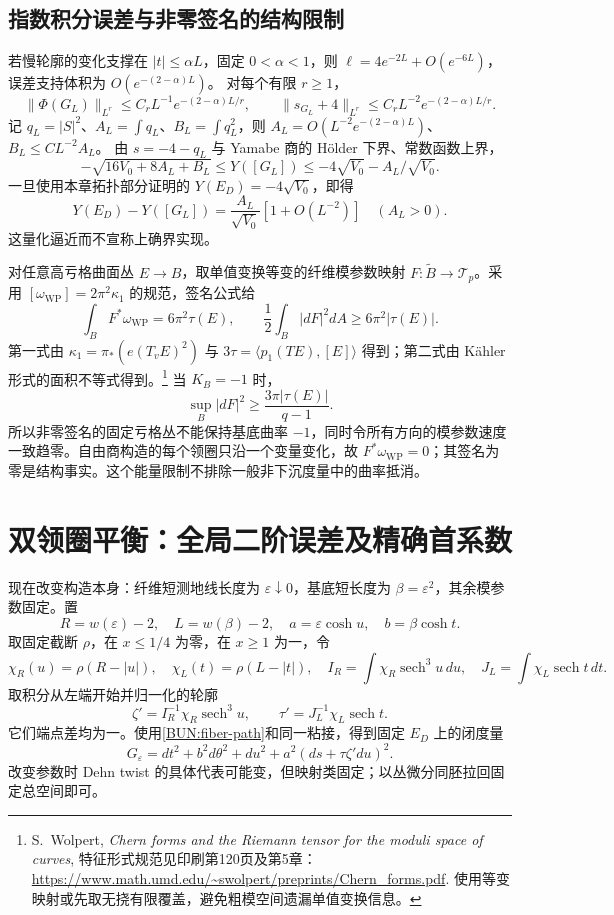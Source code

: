 \documentclass[UTF8,fontset=fandol,zihao=-4,oneside,openany]{ctexbook}
\theoremstyle{cjkplain}
\numberwithin{equation}{chapter}
\begin{document}
\subsection{指数积分误差与非零签名的结构限制}
若慢轮廓的变化支撑在 $|t|\le\alpha L$，固定 $0<\alpha<1$，则
$\ell=4e^{-2L}+O(e^{-6L})$，误差支持体积为 $O(e^{-(2-\alpha)L})$。
对每个有限 $r\ge1$，
\[
 \|\Phi(G_L)\|_{L^r}\le C_rL^{-1}e^{-(2-\alpha)L/r},
 \qquad\|s_{G_L}+4\|_{L^r}\le C_rL^{-2}e^{-(2-\alpha)L/r}.
\]
记 $q_L=|S|^2$、$A_L=\int q_L$、$B_L=\int q_L^2$，则
$A_L=O(L^{-2}e^{-(2-\alpha)L})$、$B_L\le CL^{-2}A_L$。
由 $s=-4-q_L$ 与 Yamabe 商的 Hölder 下界、常数函数上界，
\[
 -\sqrt{16V_0+8A_L+B_L}\le Y([G_L])
 \le-4\sqrt{V_0}-A_L/\sqrt{V_0}.
\]
一旦使用本章拓扑部分证明的 $Y(E_D)=-4\sqrt{V_0}$，即得
\[
 Y(E_D)-Y([G_L])=\frac{A_L}{\sqrt{V_0}}[1+O(L^{-2})]
 \quad(A_L>0).
\]
这量化逼近而不宣称上确界实现。

对任意高亏格曲面丛 $E\to B$，取单值变换等变的纤维模参数映射
$F:\widetilde B\to\mathcal T_p$。采用
$[\omega_{\mathrm{WP}}]=2\pi^2\kappa_1$ 的规范，签名公式给
\begin{equation}
 \int_B F^*\omega_{\mathrm{WP}}=6\pi^2\tau(E),
 \qquad\frac12\int_B|dF|^2dA\ge6\pi^2|\tau(E)|.
 \label{BUN:WP-signature}
\end{equation}
第一式由 $\kappa_1=\pi_*(e(T_vE)^2)$ 与 $3\tau=\langle p_1(TE),[E]\rangle$ 得到；第二式由 Kähler 形式的面积不等式得到。\footnote{S.~Wolpert, \emph{Chern forms and the Riemann tensor for the moduli space of curves}, 特征形式规范见印刷第120页及第5章：\url{https://www.math.umd.edu/~swolpert/preprints/Chern_forms.pdf}. 使用等变映射或先取无挠有限覆盖，避免粗模空间遗漏单值变换信息。}
当 $K_B=-1$ 时，
\[
 \sup_B|dF|^2\ge\frac{3\pi|\tau(E)|}{q-1}.
\]
所以非零签名的固定亏格丛不能保持基底曲率 $-1$，同时令所有方向的模参数速度一致趋零。自由商构造的每个领圈只沿一个变量变化，故 $F^*\omega_{\mathrm{WP}}=0$；其签名为零是结构事实。这个能量限制不排除一般非下沉度量中的曲率抵消。

\section{双领圈平衡：全局二阶误差及精确首系数}
\label{BUN:double}

现在改变构造本身：纤维短测地线长度为 $\varepsilon\downarrow0$，基底短长度为 $\beta=\varepsilon^2$，其余模参数固定。置
\[
 R=w(\varepsilon)-2,\quad L=w(\beta)-2,
 \quad a=\varepsilon\cosh u,\quad b=\beta\cosh t.
\]
取固定截断 $\rho$，在 $x\le1/4$ 为零，在 $x\ge1$ 为一，令
\[
 \chi_R(u)=\rho(R-|u|),\quad \chi_L(t)=\rho(L-|t|),
 \quad I_R=\int\chi_R\operatorname{sech}^3u\,du,
 \quad J_L=\int\chi_L\operatorname{sech}t\,dt.
\]
取积分从左端开始并归一化的轮廓
\begin{equation}
 \zeta'=I_R^{-1}\chi_R\operatorname{sech}^3u,
 \qquad \tau'=J_L^{-1}\chi_L\operatorname{sech}t.
 \label{BUN:balanced-profiles}
\end{equation}
它们端点差均为一。使用\eqref{BUN:fiber-path}和同一粘接，得到固定 $E_D$ 上的闭度量
\begin{equation}
 G_\varepsilon=dt^2+b^2d\theta^2+du^2+
 a^2(ds+\tau\zeta' du)^2.
 \label{BUN:double-metric}
\end{equation}
改变参数时 Dehn twist 的具体代表可能变，但映射类固定；以丛微分同胚拉回固定总空间即可。
\end{document}
